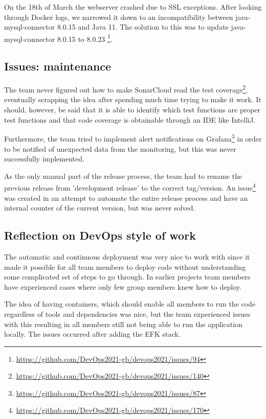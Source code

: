 On the 18th of March the webserver crashed due to SSL exceptions. After looking through Docker logs, we narrowed it down to an incompatibility between java-mysql-connector 8.0.15 and Java 11. The solution to this was to update java-mysql-connector 8.0.15 to 8.0.23 \footnote{\url{https://github.com/DevOps2021-gb/devops2021/issues/94}}.

\subsection{Issues: maintenance}
\label{issues-maintenance}
The team never figured out how to make SonarCloud read the test coverage\footnote{\url{https://github.com/DevOps2021-gb/devops2021/issues/140}}, eventually scrapping the idea after spending much time trying to make it work. It should, however, be said that it is able to identify which test functions are proper test functions and that code coverage is obtainable through an IDE like IntelliJ.

Furthermore, the team tried to implement alert notifications on Grafana\footnote{\url{https://github.com/DevOps2021-gb/devops2021/issues/87}} in order to be notified of unexpected data from the monitoring, but this was never successfully implemented.

As the only manual part of the release process, the team had to rename the previous release from 'development release' to the correct tag/version. An issue\footnote{\url{https://github.com/DevOps2021-gb/devops2021/issues/170}} was created in an attempt to automate the entire release process and have an internal counter of the current version, but was never solved.

\subsection{Reflection on DevOps style of work}
The automatic and continuous deployment was very nice to work with since it made it possible for all team members to deploy code without understanding some complicated set of steps to go through. In earlier projects team members have experienced cases where only few group members knew how to deploy.

The idea of having containers, which should enable all members to run the code regardless of tools and dependencies was nice, but the team experienced issues with this resulting in all members still not being able to run the application locally. The issues occurred after adding the EFK stack.

